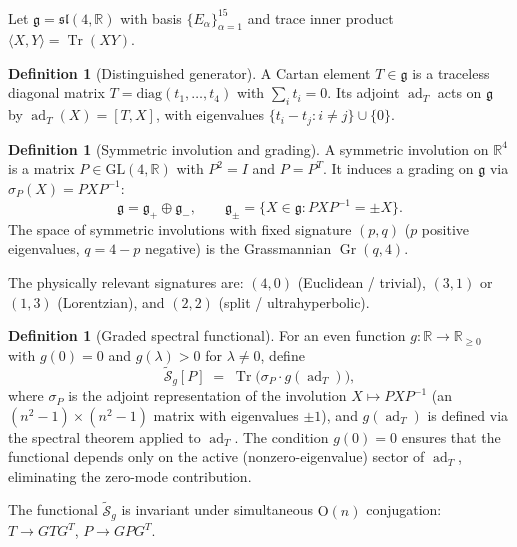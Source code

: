 \documentclass[11pt]{article}
\theoremstyle{plain}
\theoremstyle{definition}
\newtheorem{definition}[theorem]{Definition}
\theoremstyle{remark}
\newcommand{\sln}[1]{\mathfrak{sl}(#1,\mathbb{R})}
\newcommand{\ad}{\operatorname{ad}}
\newcommand{\Tr}{\operatorname{Tr}}
\newcommand{\Gr}{\operatorname{Gr}}
\begin{document}
Let $\mathfrak{g} = \sln{4}$ with basis $\{E_\alpha\}_{\alpha=1}^{15}$
and trace inner product $\langle X, Y \rangle = \Tr(XY)$.

\begin{definition}[Distinguished generator]
A Cartan element $T \in \mathfrak{g}$ is a traceless diagonal
matrix $T = \mathrm{diag}(t_1, \ldots, t_4)$ with $\sum_i t_i = 0$.
Its adjoint $\ad_T$ acts on $\mathfrak{g}$ by
$\ad_T(X) = [T, X]$, with eigenvalues
$\{t_i - t_j : i \ne j\} \cup \{0\}$.
\end{definition}

\begin{definition}[Symmetric involution and grading]
A symmetric involution on $\mathbb{R}^4$ is a matrix
$P \in \mathrm{GL}(4,\mathbb{R})$ with $P^2 = I$ and $P = P^T$.
It induces a grading on $\mathfrak{g}$ via $\sigma_P(X) = PXP^{-1}$:
\[
  \mathfrak{g} = \mathfrak{g}_+ \oplus \mathfrak{g}_-,
  \qquad
  \mathfrak{g}_\pm = \{X \in \mathfrak{g} : PXP^{-1} = \pm X\}.
\]
The space of symmetric involutions with fixed signature $(p,q)$
($p$ positive eigenvalues, $q = 4{-}p$ negative) is the
Grassmannian $\Gr(q, 4)$.
\end{definition}

The physically relevant signatures are:
$(4,0)$ (Euclidean / trivial),
$(3,1)$ or $(1,3)$ (Lorentzian),
and $(2,2)$ (split / ultrahyperbolic).

\begin{definition}[Graded spectral functional]
\label{def:functional}
For an even function $g : \mathbb{R} \to \mathbb{R}_{\ge 0}$ with
$g(0) = 0$ and $g(\lambda) > 0$ for $\lambda \ne 0$, define
\begin{equation}\label{eq:S-f}
  \widetilde{\mathcal{S}}_g[P]
  \;=\;
  \Tr\bigl(\sigma_P \cdot g(\ad_T)\bigr),
\end{equation}
where $\sigma_P$ is the adjoint representation of the involution
$X \mapsto PXP^{-1}$ (an $(n^2{-}1) \times (n^2{-}1)$ matrix with
eigenvalues $\pm 1$), and $g(\ad_T)$ is defined via the spectral
theorem applied to $\ad_T$.  The condition $g(0) = 0$ ensures that
the functional depends only on the active (nonzero-eigenvalue) sector
of $\ad_T$, eliminating the zero-mode contribution.
\end{definition}

The functional $\widetilde{\mathcal{S}}_g$ is invariant under
simultaneous $\mathrm{O}(n)$ conjugation:
$T \to GTG^T$, $P \to GPG^T$.

\end{document}
